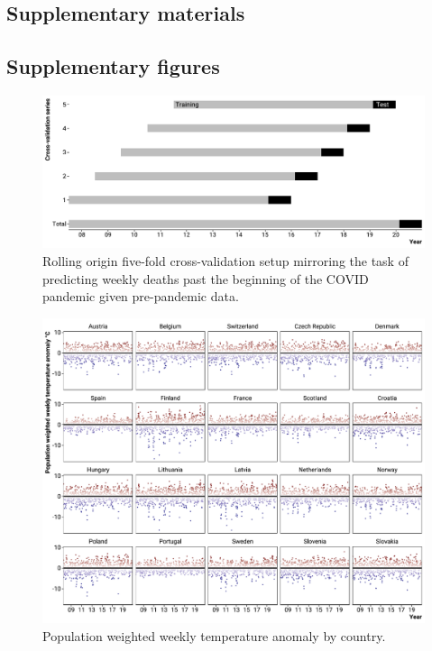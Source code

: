 \documentclass[12pt]{article}
\begin{document}
\clearpage




\clearpage


\renewcommand\thefigure{S.\arabic{figure}}
\setcounter{figure}{0}

\begin{appendix}

\section*{Supplementary materials}

\subsection*{Supplementary figures}

\begin{figure}
\caption{Rolling origin five-fold cross-validation setup mirroring the task of predicting weekly deaths past the beginning of the COVID pandemic given pre-pandemic data.}
\label{fig:cvsetup}
\includegraphics{cvsetup.pdf}
\end{figure}

\begin{figure}
  \caption{Population weighted weekly temperature anomaly by country.}
  \label{fig:tanomaly}
  \includegraphics{tanomaly.pdf}
\end{figure}


\end{appendix}
\end{document}
